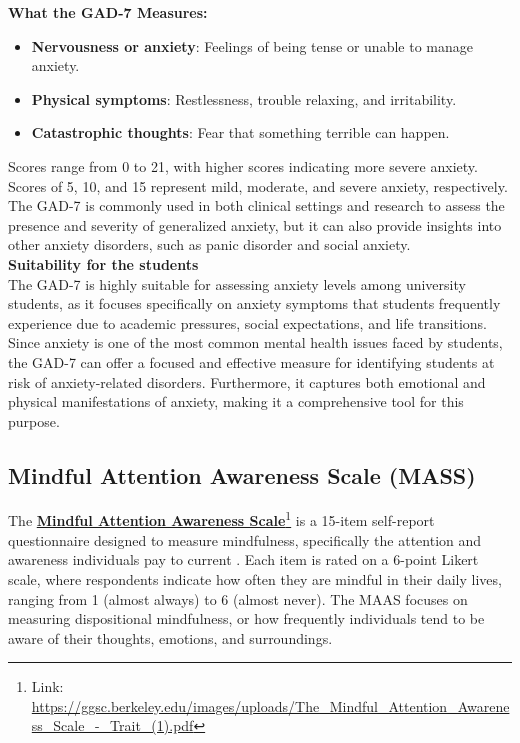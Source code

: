 \noindent \textbf{What the GAD-7 Measures:}
\begin{itemize}
    \item \textbf{Nervousness or anxiety}: Feelings of being tense or unable to manage anxiety.
    \item \textbf{Physical symptoms}: Restlessness, trouble relaxing, and irritability.
    \item \textbf{Catastrophic thoughts}: Fear that something terrible can happen.
\end{itemize}
Scores range from 0 to 21, with higher scores indicating more severe anxiety. Scores of 5, 10, and 15 represent mild, moderate, and severe anxiety, respectively. The GAD-7 is commonly used in both clinical settings and research to assess the presence and severity of generalized anxiety, but it can also provide insights into other anxiety disorders, such as panic disorder and social anxiety.\vspace{5mm} \\
\textbf{Suitability for the students} \\
The GAD-7 is highly suitable for assessing anxiety levels among university students, as it focuses specifically on anxiety symptoms that students frequently experience due to academic pressures, social expectations, and life transitions. Since anxiety is one of the most common mental health issues faced by students, the GAD-7 can offer a focused and effective measure for identifying students at risk of anxiety-related disorders. Furthermore, it captures both emotional and physical manifestations of anxiety, making it a comprehensive tool for this purpose.

\subsection{Mindful Attention Awareness Scale (MASS)}

The \textbf{\href{https://ggsc.berkeley.edu/images/uploads/The_Mindful_Attention_Awareness_Scale_-_Trait_(1).pdf}{Mindful Attention Awareness Scale}}\footnote{Link: \url{https://ggsc.berkeley.edu/images/uploads/The_Mindful_Attention_Awareness_Scale_-_Trait_(1).pdf}} is a 15-item self-report questionnaire designed to measure mindfulness, specifically the attention and awareness individuals pay to current \cite{maas-review}. Each item is rated on a 6-point Likert scale, where respondents indicate how often they are mindful in their daily lives, ranging from 1 (almost always) to 6 (almost never). The MAAS focuses on measuring dispositional mindfulness, or how frequently individuals tend to be aware of their thoughts, emotions, and surroundings.\vspace{5mm}

